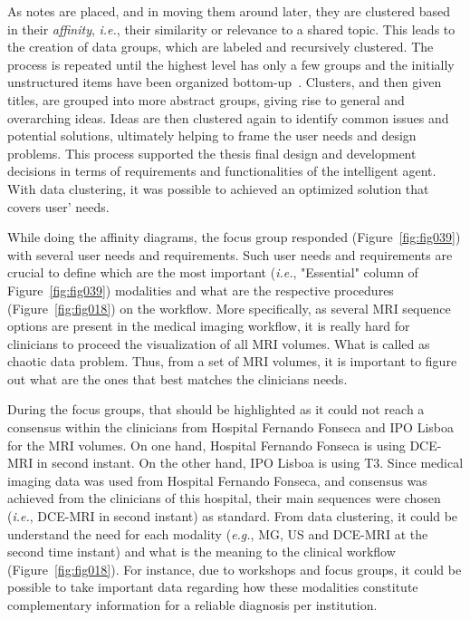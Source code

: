 As notes are placed, and in moving them around later, they are clustered based in their {\it affinity}, {\it i.e.}, their similarity or relevance to a shared topic.
This leads to the creation of data groups, which are labeled and recursively clustered.
The process is repeated until the highest level has only a few groups and the initially unstructured items have been organized bottom-up~\cite{harrington2016affinity, 10.1145/3290605.3300628, 10.1145/3173574.3173704}.
Clusters, and then given titles, are grouped into more abstract groups, giving rise to general and overarching ideas.
Ideas are then clustered again to identify common issues and potential solutions, ultimately helping to frame the user needs and design problems.
This process supported the thesis final design and development decisions in terms of requirements and functionalities of the intelligent agent.
With data clustering, it was possible to achieved an optimized solution that covers user' needs.

While doing the affinity diagrams, the focus group responded (Figure~\ref{fig:fig039}) with several user needs and requirements.
Such user needs and requirements are crucial to define which are the most important ({\it i.e.}, "Essential" column of Figure~\ref{fig:fig039}) modalities and what are the respective procedures (Figure~\ref{fig:fig018}) on the workflow.
More specifically, as several \ac{MRI} sequence options are present in the medical imaging workflow, it is really hard for clinicians to proceed the visualization of all \ac{MRI} volumes.
What is called as chaotic data problem.
Thus, from a set of \ac{MRI} volumes, it is important to figure out what are the ones that best matches the clinicians needs.

During the focus groups, that should be highlighted as it could not reach a consensus within the clinicians from Hospital Fernando Fonseca and IPO Lisboa for the \ac{MRI} volumes.
On one hand, Hospital Fernando Fonseca is using \ac{DCE}-\ac{MRI} in second instant.
On the other hand, IPO Lisboa is using T3.
Since medical imaging data was used from Hospital Fernando Fonseca, and consensus was achieved from the clinicians of this hospital, their main sequences were chosen ({\it i.e.}, \ac{DCE}-\ac{MRI} in second instant) as standard.
From data clustering, it could be understand the need for each modality ({\it e.g.}, \ac{MG}, \ac{US} and \ac{DCE}-\ac{MRI} at the second time instant) and what is the meaning to the clinical workflow (Figure~\ref{fig:fig018}).
For instance, due to workshops and focus groups, it could be possible to take important data regarding how these modalities constitute complementary information for a reliable diagnosis per institution.

